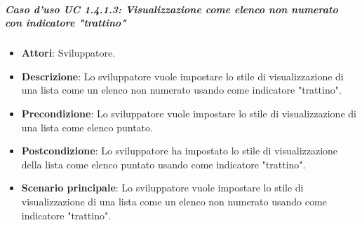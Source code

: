 \subparagraph{Caso d'uso UC 1.4.1.3: Visualizzazione come elenco non numerato con indicatore "trattino"}

\FloatBarrier
\begin{itemize}
\item\textbf{Attori}: Sviluppatore.
\item\textbf{Descrizione}: Lo sviluppatore vuole impostare lo stile di visualizzazione di una lista come un elenco non numerato usando come indicatore "trattino".
\item\textbf{Precondizione}: Lo sviluppatore vuole impostare lo stile di visualizzazione di una lista come elenco puntato.
\item\textbf{Postcondizione}: Lo sviluppatore ha impostato lo stile di visualizzazione della lista come elenco puntato usando come indicatore "trattino".
\item\textbf{Scenario principale}: Lo sviluppatore vuole impostare lo stile di visualizzazione di una lista come un elenco non numerato usando come indicatore "trattino".
\end{itemize}
